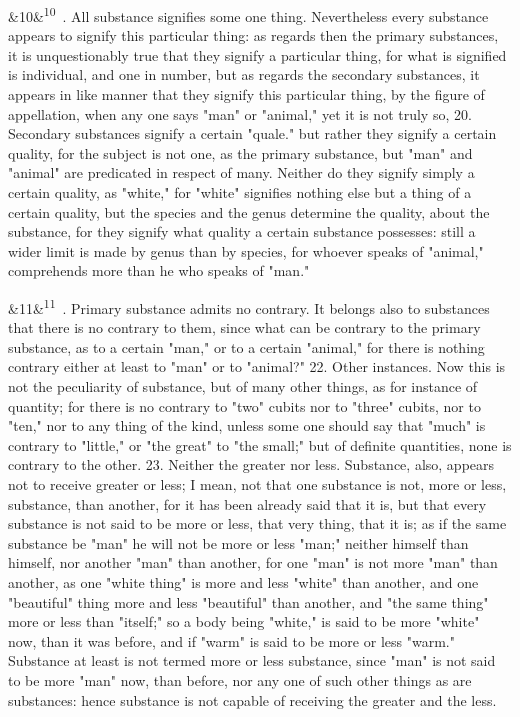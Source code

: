 \documentclass[12pt]{article}
\newcommand{\para}[1][]{\par\noindent\ifx&#1&\else\textsuperscript{\footnotesize #1}~\fi}
\begin{document}
\para[10] 19. All substance signifies some one thing. Nevertheless every substance appears to signify this particular thing: as regards then the primary substances, it is unquestionably true that they signify a particular thing, for what is signified is individual, and one in number, but as regards the secondary substances, it appears in like manner that they signify this particular thing, by the figure of appellation, when any one says "man" or "animal," yet it is not truly so, 20. Secondary substances signify a certain "quale." but rather they signify a certain quality, for the subject is not one, as the primary substance, but "man" and "animal" are predicated in respect of many. Neither do they signify simply a certain quality, as "white," for "white" signifies nothing else but a thing of a certain quality, but the species and the genus determine the quality, about the substance, for they signify what quality a certain substance possesses: still a wider limit is made by genus than by species, for whoever speaks of "animal," comprehends more than he who speaks of "man."

\para[11] 21. Primary substance admits no contrary. It belongs also to substances that there is no contrary to them, since what can be contrary to the primary substance, as to a certain "man," or to a certain "animal," for there is nothing contrary either at least to "man" or to "animal?" 22. Other instances. Now this is not the peculiarity of substance, but of many other things, as for instance of quantity; for there is no contrary to "two" cubits nor to "three" cubits, nor to "ten," nor to any thing of the kind, unless some one should say that "much" is contrary to "little," or "the great" to "the small;" but of definite quantities, none is contrary to the other. 23. Neither the greater nor less. Substance, also, appears not to receive greater or less; I mean, not that one substance is not, more or less, substance, than another, for it has been already said that it is, but that every substance is not said to be more or less, that very thing, that it is; as if the same substance be "man" he will not be more or less "man;" neither himself than himself, nor another "man" than another, for one "man" is not more "man" than another, as one "white thing" is more and less "white" than another, and one "beautiful" thing more and less "beautiful" than another, and "the same thing" more or less than "itself;" so a body being "white," is said to be more "white" now, than it was before, and if "warm" is said to be more or less "warm." Substance at least is not termed more or less substance, since "man" is not said to be more "man" now, than before, nor any one of such other things as are substances: hence substance is not capable of receiving the greater and the less.
\end{document}
